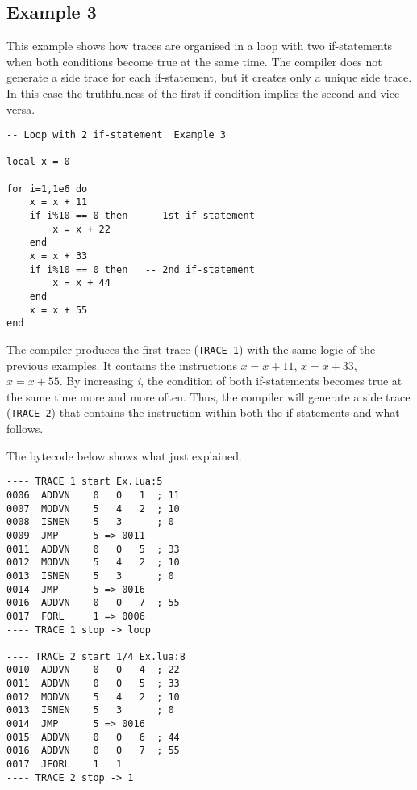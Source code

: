 \newpage

\subsection{Example 3}
\label{2-if-example3}
This example shows how traces are organised in a loop with two if-statements when both conditions become true at the same time. The compiler does not generate a side trace for each if-statement, but it creates only a unique side trace. In this case the truthfulness of the first if-condition implies the second and vice versa.
\begin{mdframed}[style=LuaStyleFrame]
\begin{lstlisting}[style=LuaStyle]
-- Loop with 2 if-statement  Example 3

local x = 0

for i=1,1e6 do
	x = x + 11
	if i%10 == 0 then   -- 1st if-statement
		x = x + 22
	end
	x = x + 33
	if i%10 == 0 then   -- 2nd if-statement
		x = x + 44
	end
	x = x + 55
end
\end{lstlisting}
\end{mdframed}
The compiler produces the first trace (\texttt{TRACE 1}) with the same logic of the previous examples. It contains the instructions $x=x+11$, $x=x+33$, $x=x+55$. By increasing \textit{i}, the condition of both if-statements becomes true at the same time more and more often. Thus, the compiler will generate a side trace (\texttt{TRACE 2}) that contains the instruction within both the if-statements and what follows.

The bytecode below shows what just explained.

\begin{multicols}{2}
\begin{lstlisting}[style=DumpStyle]
---- TRACE 1 start Ex.lua:5
0006  ADDVN    0   0   1  ; 11
0007  MODVN    5   4   2  ; 10
0008  ISNEN    5   3      ; 0
0009  JMP      5 => 0011
0011  ADDVN    0   0   5  ; 33
0012  MODVN    5   4   2  ; 10
0013  ISNEN    5   3      ; 0
0014  JMP      5 => 0016
0016  ADDVN    0   0   7  ; 55
0017  FORL     1 => 0006
---- TRACE 1 stop -> loop

---- TRACE 2 start 1/4 Ex.lua:8
0010  ADDVN    0   0   4  ; 22
0011  ADDVN    0   0   5  ; 33
0012  MODVN    5   4   2  ; 10
0013  ISNEN    5   3      ; 0
0014  JMP      5 => 0016
0015  ADDVN    0   0   6  ; 44
0016  ADDVN    0   0   7  ; 55
0017  JFORL    1   1
---- TRACE 2 stop -> 1
\end{lstlisting}
\end{multicols}

